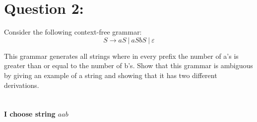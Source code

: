 \documentclass [9 pt]{article}
\theoremstyle{definition}
\begin{document}
\newpage
\section*{Question 2:}
 Consider the following context-free grammar:
 $$S \to aS\ |\ aSbS \ |\  \varepsilon$$
 
This grammar generates all strings where in every prefix the number of a’s is greater than or equal to the number of b’s. Show that this grammar is ambiguous by giving an example of a string and showing that it has two different derivations.
\\
\\
\\
\textbf{ I choose string $aab$ }\\
\begin{center}
\end{center}

\begin{center}
\end{center}












\newpage
\end{document}
